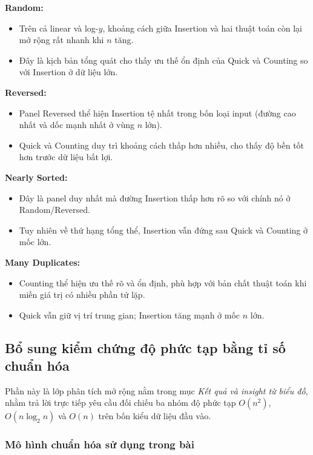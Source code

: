 \textbf{Random:}
\begin{itemize}[leftmargin=1.2cm]
    \item Trên cả linear và log-$y$, khoảng cách giữa Insertion và hai thuật toán còn lại mở rộng rất nhanh khi $n$ tăng.
    \item Đây là kịch bản tổng quát cho thấy ưu thế ổn định của Quick và Counting so với Insertion ở dữ liệu lớn.
\end{itemize}

\textbf{Reversed:}
\begin{itemize}[leftmargin=1.2cm]
    \item Panel Reversed thể hiện Insertion tệ nhất trong bốn loại input (đường cao nhất và dốc mạnh nhất ở vùng $n$ lớn).
    \item Quick và Counting duy trì khoảng cách thấp hơn nhiều, cho thấy độ bền tốt hơn trước dữ liệu bất lợi.
\end{itemize}

\textbf{Nearly Sorted:}
\begin{itemize}[leftmargin=1.2cm]
    \item Đây là panel duy nhất mà đường Insertion thấp hơn rõ so với chính nó ở Random/Reversed.
    \item Tuy nhiên về thứ hạng tổng thể, Insertion vẫn đứng sau Quick và Counting ở mốc lớn.
\end{itemize}

\textbf{Many Duplicates:}
\begin{itemize}[leftmargin=1.2cm]
    \item Counting thể hiện ưu thế rõ và ổn định, phù hợp với bản chất thuật toán khi miền giá trị có nhiều phần tử lặp.
    \item Quick vẫn giữ vị trí trung gian; Insertion tăng mạnh ở mốc $n$ lớn.
\end{itemize}

\subsection{Bổ sung kiểm chứng độ phức tạp bằng tỉ số chuẩn hóa}

Phần này là lớp phân tích mở rộng nằm trong mục \textit{Kết quả và insight từ biểu đồ},
nhằm trả lời trực tiếp yêu cầu đối chiếu ba nhóm độ phức tạp $O(n^2)$, $O(n\log_2 n)$ và $O(n)$
trên bốn kiểu dữ liệu đầu vào.

\subsubsection{Mô hình chuẩn hóa sử dụng trong bài}


